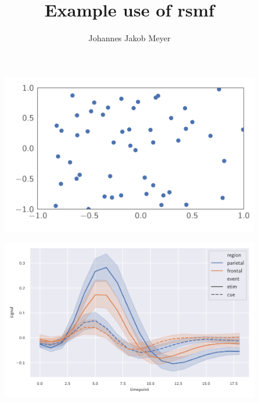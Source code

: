 \documentclass[a4paper]{quantumarticle}
\title{Example use of rsmf}
\author{Johannes Jakob Meyer}
\begin{document}
\maketitle

\lipsum[1-10]

\begin{figure}
	\centering
	\includegraphics{scatter}
	\caption{\lipsum[2]}
\end{figure}

\lipsum[11-20]

\begin{figure}
	\centering
	\includegraphics{fmri}
	\caption{\lipsum[1-2]}
\end{figure}

\lipsum[21-30]
\end{document}
